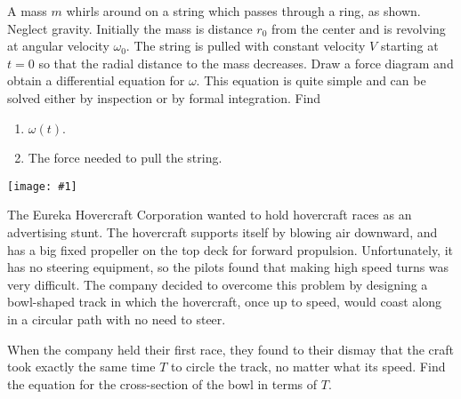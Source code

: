 \documentclass[12pt,letterpaper]{hmcpset}
\newcommand{\diagram}[1]{\begin{center}\texttt{[image: \#1]}\end{center}}
\begin{document}
\begin{solution}
    \vfill
\end{solution}
\newpage

\begin{problem}
    A mass $m$ whirls around on a string
    which passes through a ring, as shown.
    Neglect gravity. Initially the mass
    is distance $r_{0}$ from the center and 
    is revolving at angular velocity $\omega_{0}$. 
    The string is pulled with constant velocity
    $V$ starting at $t = 0$ so that the radial 
    distance to the mass decreases. Draw a force
    diagram and obtain a differential equation for
    $\omega$. This equation is quite simple and 
    can be solved either by inspection
    or by formal integration. Find

    \begin{enumerate}
    \item $\omega(t)$.
    \item The force needed to pull the string.
    \end{enumerate}

    \diagram{img/3_22.png}
\end{problem}

\begin{solution}
    \vfill
\end{solution}
\newpage

\begin{problem}[5 - Hovercraft - KK 3.25]
The Eureka Hovercraft Corporation wanted
to hold hovercraft races as an advertising 
stunt. The hovercraft supports itself 
by blowing air downward, and has a big 
fixed propeller on the top deck for forward
propulsion. Unfortunately, it has no 
steering equipment, so the pilots found that 
making high speed turns was very difficult.
The company decided to overcome this problem 
by designing a bowl-shaped track in which the
hovercraft, once up to speed, would coast 
along in a circular path with no need to steer.

When the company held their first race, they 
found to their dismay that the craft took 
exactly the same time $T$ to circle the track,
no matter what its speed. Find the equation
for the cross-section of the bowl in terms of $T$.
\end{problem}

\begin{solution}
    \vfill
\end{solution}
\newpage
\end{document}
